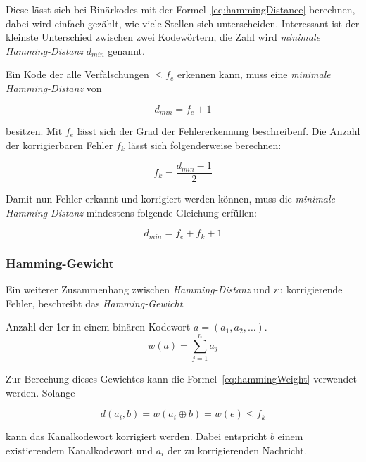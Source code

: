 Diese lässt sich bei Binärkodes mit der Formel~\ref{eq:hammingDistance} berechnen, dabei wird einfach gezählt, wie viele Stellen sich unterscheiden. Interessant ist der kleinste Unterschied zwischen zwei Kodewörtern, die Zahl wird \emph{minimale Hamming-Distanz} $d_{min}$ genannt.

Ein Kode der alle Verfälschungen $\leq f_e$ erkennen kann, muss eine \emph{minimale Hamming-Distanz} von 

\begin{equation}
d_{min} = f_e + 1
\end{equation}

besitzen. Mit $f_e$ lässt sich der Grad der Fehlererkennung beschreibenf. Die Anzahl der korrigierbaren Fehler $f_k$ lässt sich folgenderweise berechnen:

\begin{equation}
f_k = \frac{d_{min}-1}{2}
\end{equation}

Damit nun Fehler erkannt und korrigiert werden können, muss die \emph{minimale Hamming-Distanz} mindestens folgende Gleichung erfüllen: \cite[132 f.]{schoenfeld2012informations}

\begin{equation}
d_{min} = f_e + f_k + 1
\end{equation} 

\subsubsection{Hamming-Gewicht}
\label{sec:hammingWeight}
Ein weiterer Zusammenhang zwischen \emph{Hamming-Distanz} und zu korrigierende Fehler, beschreibt das \emph{Hamming-Gewicht}.

\begin{t_def}
Anzahl der 1er in einem binären Kodewort $a=(a_1,a_2,\dotsc)$.
\begin{equation}
w(a) = \sum^n_{j=1} a_j
\label{eq:hammingWeight}
\end{equation} 
\end{t_def} 

Zur Berechung dieses Gewichtes kann die Formel~\ref{eq:hammingWeight} verwendet werden. Solange 

\begin{equation}
d(a_i,b)=w(a_i \oplus b) = w(e) \leq f_k
\end{equation} 

kann das Kanalkodewort korrigiert werden. Dabei entspricht $b$ einem existierendem Kanalkodewort und $a_i$ der zu korrigierenden Nachricht. \cite[134]{schoenfeld2012informations}
